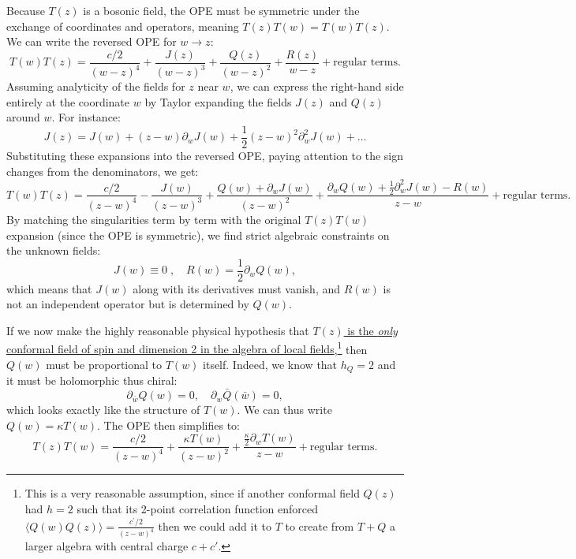 Because \(T(z)\) is a bosonic field, the OPE must be symmetric under the exchange of coordinates and operators, meaning \(T(z)T(w) = T(w)T(z)\). We can write the reversed OPE for \(w \to z\):
\[
    T(w)T(z) = \frac{c/2}{(w-z)^4} + \frac{J(z)}{(w-z)^3} + \frac{Q(z)}{(w-z)^2} + \frac{R(z)}{w-z} + \text{regular terms}.
\]
Assuming analyticity of the fields for \(z\) near \(w\), we can express the right-hand side entirely at the coordinate \(w\) by Taylor expanding the fields \(J(z)\) and \(Q(z)\) around \(w\). For instance:
\[
    J(z) = J(w) + (z-w)\partial_w J(w) + \frac{1}{2}(z-w)^2 \partial_w^2 J(w) + \dots
\]
Substituting these expansions into the reversed OPE, paying attention to the sign changes from the denominators, we get:
\[
    T(w)T(z) = \frac{c/2}{(z-w)^4} - \frac{J(w)}{(z-w)^3} + \frac{Q(w) + \partial_w J(w)}{(z-w)^2} + \frac{\partial_w Q(w) + \frac{1}{2}\partial_w^2 J(w) - R(w)}{z-w} + \text{regular terms}.
\]
By matching the singularities term by term with the original \(T(z)T(w)\) expansion (since the OPE is symmetric), we find strict algebraic constraints on the unknown fields:
\[
    J(w) \equiv 0 \;, \quad R(w) = \frac{1}{2}\partial_w Q(w),
\]
which means that \(J(w)\) along with its derivatives must vanish, and \(R(w)\) is not an independent operator but is determined by \(Q(w)\).

If we now make the highly reasonable physical hypothesis that \uline{\(T(z)\) is the \textit{only} conformal field of spin and dimension 2 in the algebra of local fields},\footnote{This is a very reasonable assumption, since if another conformal field \(Q(z)\) had \(h=2\) such that its 2-point correlation function enforced \(\langle Q(w)Q(z)\rangle = \frac{c^{\prime} / 2}{(z-w)^4}\) then we could add it to \(T\) to create from \(T+Q\) a larger algebra with central charge \(c + c'\).} then \(Q(w)\) must be proportional to \(T(w)\) itself. Indeed, we know that \(h_Q=2\) and it must be holomorphic thus chiral:
\[
    \partial_{\bar{w}} Q(w) = 0, \quad \partial_w \bar{Q}(\bar{w}) = 0,
\]
which looks exactly like the structure of \(T(w)\). We can thus write \(Q(w) = \kappa T(w)\). The OPE then simplifies to:
\[
    T(z)T(w) = \frac{c/2}{(z-w)^4} + \frac{\kappa T(w)}{(z-w)^2} + \frac{\frac{\kappa}{2} \partial_w T(w)}{z-w} + \text{regular terms}.
\]

